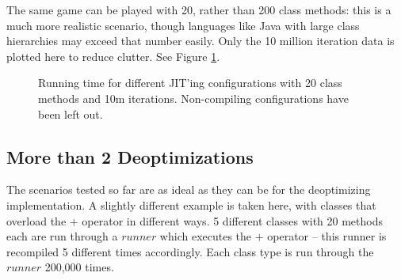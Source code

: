\documentclass[journal,comsoc]{IEEEtran}
\begin{document}
	The same game can be played with 20, rather than 200 class methods: this is a much more realistic scenario, though languages like Java with large class hierarchies may exceed that number easily. Only the 10 million iteration data is plotted here to reduce clutter. See Figure \ref{fig:20methods_10miterations}.
		\begin{figure}[htb]

		\caption{Running time for different JIT'ing configurations with 20 class methods and 10m iterations. Non-compiling configurations have been left out.}
				\label{fig:20methods_10miterations}
		\end{figure}	
	
	
	
	\subsection{More than 2 Deoptimizations}
	The scenarios tested so far are as ideal as they can be for the deoptimizing implementation. A slightly different example is taken here, with classes that overload the $+$ operator in different ways. 5 different classes with 20 methods each are run through a $runner$ which executes the $+$ operator -- this runner is recompiled 5 different times accordingly. Each class type is run through the $runner$ 200,000 times.
	
\end{document}
